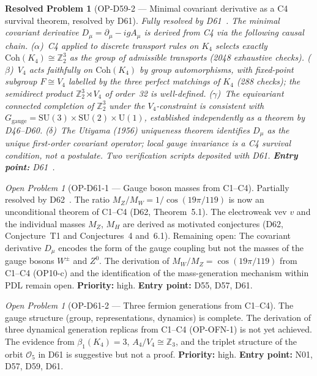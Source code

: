 \documentclass[11pt,a4paper]{article}
\newtheorem{resolvedproblem}{Resolved Problem}
\theoremstyle{plain}
\theoremstyle{definition}
\theoremstyle{remark}
\newtheorem{openproblem}[theorem]{Open Problem}
\begin{document}
\begin{resolvedproblem}[OP-D59-2 --- Minimal covariant derivative as a C4 survival theorem, resolved by D61]
\label{op:D59two}
\textcolor{proofblue}{Fully resolved by D61~\cite{D61}.} The minimal covariant derivative $D_\mu = \partial_\mu - igA_\mu$ is derived from C4 via the following causal chain. ($\alpha$)~C4 applied to discrete transport rules on $K_4$ selects exactly $\mathrm{Coh}(K_4) \cong \mathbb{Z}_2^3$ as the group of admissible transports (2048 exhaustive checks). ($\beta$)~$V_4$ acts faithfully on $\mathrm{Coh}(K_4)$ by group automorphisms, with fixed-point subgroup $F \cong V_4$ labelled by the three perfect matchings of $K_4$ (288 checks); the semidirect product $\mathbb{Z}_2^3 \rtimes V_4$ of order~32 is well-defined. ($\gamma$)~The equivariant connected completion of $\mathbb{Z}_2^3$ under the $V_4$-constraint is consistent with $G_\mathrm{gauge} = \mathrm{SU}(3)\times\mathrm{SU}(2)\times\mathrm{U}(1)$, established independently as a theorem by D46--D60. ($\delta$)~The Utiyama (1956) uniqueness theorem identifies $D_\mu$ as the unique first-order covariant operator; local gauge invariance is a C4 survival condition, not a postulate. Two verification scripts deposited with D61. \textbf{Entry point:} D61~\cite{D61}.
\end{resolvedproblem}

\begin{openproblem}[OP-D61-1 --- Gauge boson masses from C1--C4] \textcolor{proofblue}{Partially resolved by D62~\cite{D62}.} The ratio $M_Z/M_W = 1/\cos(19\pi/119)$ is now an unconditional theorem of C1--C4 (D62, Theorem~5.1). The electroweak vev $v$ and the individual masses $M_Z$, $M_H$ are derived as motivated conjectures (D62, Conjecture~T1 and Conjectures~4 and~6.1). Remaining open:
\label{op:D61one}
The covariant derivative $D_\mu$ encodes the form of the gauge coupling but not the masses of the gauge bosons $W^\pm$ and $Z^0$. The derivation of $M_W/M_Z = \cos(19\pi/119)$ from C1--C4 (OP10-c) and the identification of the mass-generation mechanism within PDL remain open. \textbf{Priority:} high. \textbf{Entry point:} D55, D57, D61.
\end{openproblem}

\begin{openproblem}[OP-D61-2 --- Three fermion generations from C1--C4]
\label{op:D61two}
The gauge structure (group, representations, dynamics) is complete. The derivation of three dynamical generation replicas from C1--C4 (OP-OFN-1) is not yet achieved. The evidence from $\beta_1(K_4) = 3$, $A_4/V_4 \cong \mathbb{Z}_3$, and the triplet structure of the orbit $\mathcal{O}_5$ in D61 is suggestive but not a proof. \textbf{Priority:} high. \textbf{Entry point:} N01, D57, D59, D61.
\end{openproblem}
\end{document}
